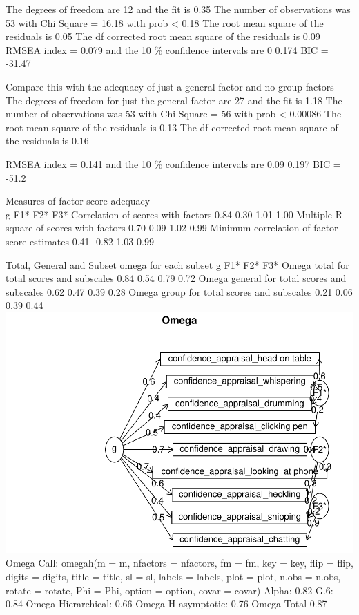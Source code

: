 \documentclass[
]{article}
\begin{document}
The degrees of freedom are 12 and the fit is 0.35 The number of
observations was 53 with Chi Square = 16.18 with prob \textless{} 0.18
The root mean square of the residuals is 0.05 The df corrected root mean
square of the residuals is 0.09 RMSEA index = 0.079 and the 10 \%
confidence intervals are 0 0.174 BIC = -31.47

Compare this with the adequacy of just a general factor and no group
factors The degrees of freedom for just the general factor are 27 and
the fit is 1.18 The number of observations was 53 with Chi Square = 56
with prob \textless{} 0.00086 The root mean square of the residuals is
0.13 The df corrected root mean square of the residuals is 0.16

RMSEA index = 0.141 and the 10 \% confidence intervals are 0.09 0.197
BIC = -51.2

Measures of factor score adequacy\\
g F1* F2* F3* Correlation of scores with factors 0.84 0.30 1.01 1.00
Multiple R square of scores with factors 0.70 0.09 1.02 0.99 Minimum
correlation of factor score estimates 0.41 -0.82 1.03 0.99

Total, General and Subset omega for each subset g F1* F2* F3* Omega
total for total scores and subscales 0.84 0.54 0.79 0.72 Omega general
for total scores and subscales 0.62 0.47 0.39 0.28 Omega group for total
scores and subscales 0.21 0.06 0.39 0.44
\includegraphics{expertise_2024_09_26_no_outlierdetection_MK_files/figure-latex/sri_omega-2.pdf}
Omega Call: omegah(m = m, nfactors = nfactors, fm = fm, key = key, flip
= flip, digits = digits, title = title, sl = sl, labels = labels, plot =
plot, n.obs = n.obs, rotate = rotate, Phi = Phi, option = option, covar
= covar) Alpha: 0.82 G.6: 0.84 Omega Hierarchical: 0.66 Omega H
asymptotic: 0.76 Omega Total 0.87
\end{document}
